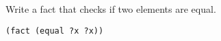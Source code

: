 \question Write a fact that checks if two elements are equal.
\begin{solution}[.5in]
\begin{lstlisting}
(fact (equal ?x ?x))
\end{lstlisting}
\end{solution}
